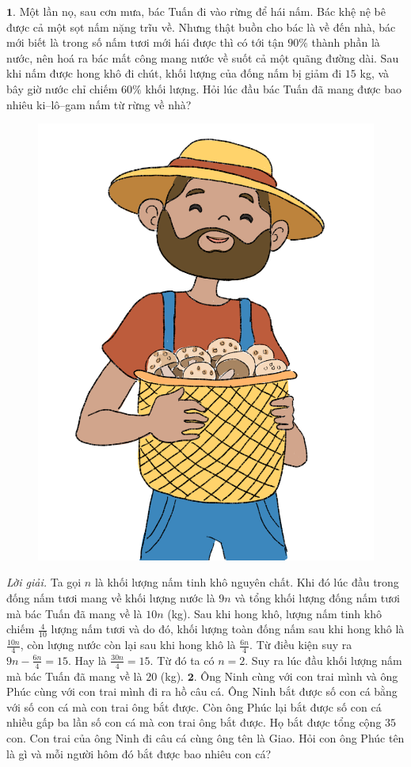 \begin{multicols}{2}
	$\pmb{1.}$ Một lần nọ, sau cơn mưa, bác Tuấn đi vào rừng để hái nấm. Bác khệ nệ bê được cả một sọt nấm nặng trĩu về. Nhưng thật buồn cho bác là về đến nhà, bác mới biết là trong số nấm tươi mới hái được thì có tới tận $90\%$ thành phần là nước, nên hoá ra bác mất công mang nước về suốt cả một quãng đường dài. Sau khi nấm được hong khô đi chút, khối lượng của đống nấm bị giảm đi $15$ kg, và bây giờ nước chỉ chiếm $60\%$ khối lượng. Hỏi lúc đầu bác Tuấn đã mang được bao nhiêu ki--lô--gam nấm từ rừng về nhà?
	\begin{figure}[H]
		\centering
		\vspace*{-10pt}
		\captionsetup{labelformat= empty, justification=centering}
		\includegraphics[width=0.6\linewidth]{bai1}
		\vspace*{-10pt}
	\end{figure}
	\textit{Lời giải.} 	Ta gọi $n$ là khối lượng nấm tinh khô nguyên chất. Khi đó lúc đầu trong đống nấm tươi mang về khối lượng nước là $9n$ và tổng khối lượng đống nấm tươi mà bác Tuấn đã mang về là $10n$ (kg). Sau khi hong khô, lượng nấm tinh khô chiếm $\frac{4}{10}$ lượng nấm tươi và do đó, khối lượng toàn đống nấm sau khi hong khô là $\frac{10n}{4}$, còn lượng nước còn lại sau khi hong khô là $\frac{6n}{4}$.
	\vskip 0.1cm
	Từ điều kiện suy ra $9n-\frac{6n}{4} =15$. Hay là $\frac{30n}{4}=15$. Từ đó ta có $n=2$. Suy ra lúc đầu khối lượng nấm mà bác Tuấn đã mang về là $20$ (kg).
	\vskip 0.1cm
	$\pmb{2.}$ Ông Ninh cùng với con trai mình và ông Phúc cùng với con trai mình đi ra hồ câu cá. Ông Ninh bắt được số con cá bằng với số con cá mà con trai ông  bắt được. Còn ông Phúc lại bắt được số con cá nhiều gấp ba lần số con cá mà con trai ông bắt được. Họ bắt được tổng cộng  $35$ con. Con trai của ông Ninh đi câu cá cùng ông tên là Giao. Hỏi con ông Phúc tên là gì và mỗi người hôm đó bắt được bao nhiêu con cá?

\end{multicols}
